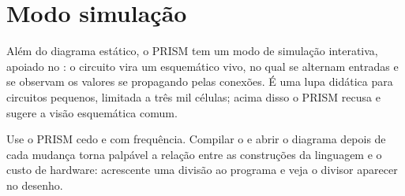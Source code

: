 \section{Modo simulação}

Além do diagrama estático, o PRISM tem um modo de simulação interativa, apoiado no : o circuito vira um esquemático vivo, no qual se alternam entradas e se observam os valores se propagando pelas conexões. É uma lupa didática para circuitos pequenos, limitada a três mil células; acima disso o PRISM recusa e sugere a visão esquemática comum.

\begin{nota}
Use o PRISM cedo e com frequência. Compilar o  e abrir o diagrama depois de cada mudança torna palpável a relação entre as construções da linguagem e o custo de hardware: acrescente uma divisão ao programa e veja o divisor aparecer no desenho.
\end{nota}
